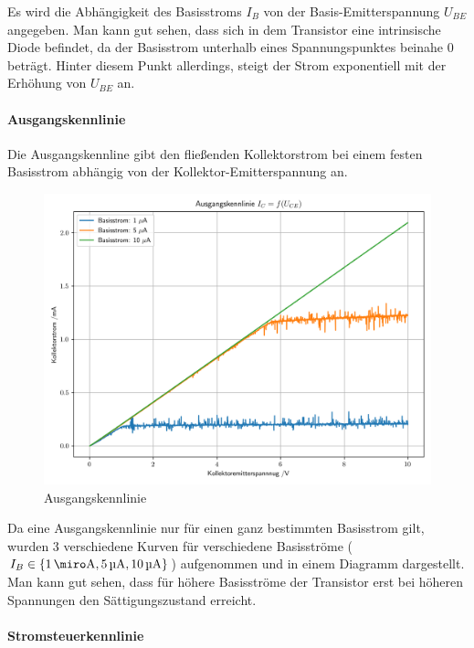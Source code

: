\documentclass[12pt,twoside,a4paper]{scrartcl}
\begin{document}
            Es wird die Abhängigkeit des Basisstroms $I_B$ von der Basis-Emitterspannung $U_{BE}$ angegeben. Man kann gut sehen, dass sich in dem Transistor eine intrinsische Diode befindet, da der Basisstrom unterhalb eines Spannungspunktes beinahe $0$ beträgt. Hinter diesem Punkt allerdings, steigt der Strom exponentiell mit der Erhöhung von $U_{BE}$ an.


        \paragraph{Ausgangskennlinie}

					Die Ausgangskennline gibt den fließenden Kollektorstrom bei einem festen Basisstrom abhängig von der Kollektor-Emitterspannung an.

            \begin{figure}[H]
                \centering

                \includegraphics[width = 0.9 \textwidth]{Plots/Transistor/Ausgangskennlinen}

                \caption{Ausgangskennlinie}
            \end{figure}

            Da eine Ausgangskennlinie nur für einen ganz bestimmten Basisstrom gilt, wurden 3 verschiedene Kurven für verschiedene Basisströme ($I_B \in \{ \SI{1}{\miro \ampere}, \SI{5}{\micro \ampere}, \SI{10}{\micro \ampere} \}$) aufgenommen und in einem Diagramm dargestellt. Man kann gut sehen, dass für höhere Basisströme der Transistor erst bei höheren Spannungen den Sättigungszustand erreicht.


    \paragraph{Stromsteuerkennlinie}
\end{document}
